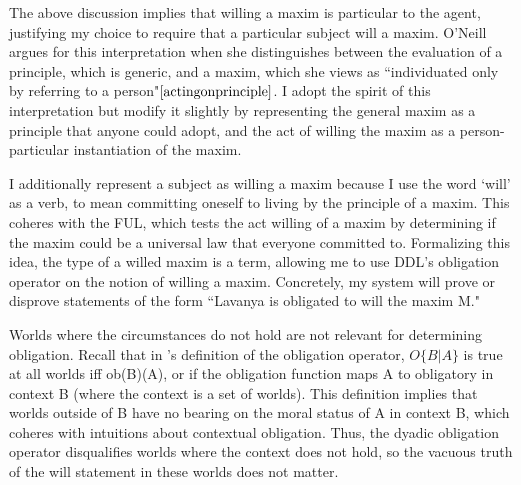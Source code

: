 \begin{isabellebody}
\begin{isamarkuptext}
The above discussion implies that willing a maxim is particular to the agent, justifying my choice to 
require that a particular subject will a maxim. O'Neill argues for this interpretation when she distinguishes 
between the evaluation of a principle, which is generic, and a maxim, which she views as ``individuated only 
by referring to a person"$\cite[13]{actingonprinciple}$. I adopt the spirit of this interpretation but modify it slightly 
by representing the general maxim as a principle that anyone could adopt, and the act of willing the maxim 
as a person-particular instantiation of the maxim.

I additionally represent a subject as willing a maxim because I use the word `will' as a verb, to mean committing oneself to living by
the principle of a maxim. This coheres with the FUL, which tests the act willing 
of a maxim by determining if the maxim could be a universal law that everyone committed to. Formalizing this idea,
the type of a willed maxim is a term, allowing me
to use DDL's obligation operator on the notion of willing a maxim. Concretely, my system will prove 
or disprove statements of the form ``Lavanya is obligated to will the maxim M." 

Worlds where the circumstances do not hold are not relevant for determining obligation. Recall that in 
\cite{BFP}'s definition of the obligation operator,  $O \{B|A\}$ is true at all worlds iff ob(B)(A), or 
if the obligation function maps A to obligatory in context B (where the context is a set of worlds). This 
definition implies that worlds outside of B have no bearing on the moral status of A in context B, which 
coheres with intuitions about contextual obligation. Thus, the dyadic obligation operator 
disqualifies worlds where the context does not hold, so the vacuous truth of the will statement in 
these worlds does not matter. 


\end{isamarkuptext}
\end{isabellebody}

